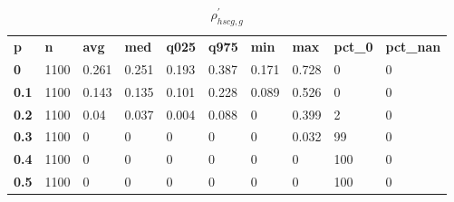 \begin{table}[h]
 \centering 
\footnotesize
\caption{$\rho_{hscg,g}^\prime $}
\label{tab:alphahscgg}
\begin{tabular}[h]{| l l l l l l l l l l|
    } \hline
\textbf{ p} & \textbf{ n} & \textbf{ avg} & \textbf{ med} & \textbf{ q025} & \textbf{ q975} & \textbf{ min} & \textbf{ max} & \textbf{ pct\_0} & \textbf{ pct\_nan}
           \\
  \textbf{  0} & 1100 & 0.261 & 0.251 & 0.193 & 0.387 & 0.171 & 0.728 &   0 & 0
           \\
  \textbf{0.1} & 1100 & 0.143 & 0.135 & 0.101 & 0.228 & 0.089 & 0.526 &   0 & 0
           \\
  \textbf{0.2} & 1100 &  0.04 & 0.037 & 0.004 & 0.088 &     0 & 0.399 &   2 & 0
           \\
  \textbf{0.3} & 1100 &     0 &     0 &     0 &     0 &     0 & 0.032 &  99 & 0
           \\
  \textbf{0.4} & 1100 &     0 &     0 &     0 &     0 &     0 &     0 & 100 & 0
           \\
  \textbf{0.5} & 1100 &     0 &     0 &     0 &     0 &     0 &     0 & 100 & 0
           \\
 \hline \end{tabular}
 \end{table}
